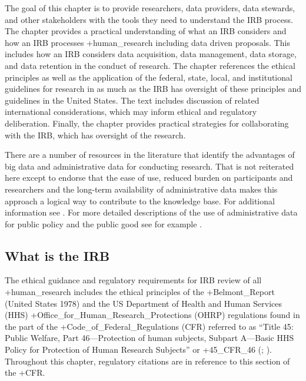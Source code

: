 \documentclass[
]{WileySix}
\begin{document}
The goal of this chapter is to provide researchers, data providers, data stewards, and other stakeholders with the tools they need to understand the IRB process. The chapter provides a practical understanding of what an IRB considers and how an IRB processes +human\_research\textbar{} including data driven proposals. This includes how an IRB considers data acquisition, data management, data storage, and data retention in the conduct of research. The chapter references the ethical principles as well as the application of the federal, state, local, and institutional guidelines for research in as much as the IRB has oversight of these principles and guidelines in the United States. The text includes discussion of related international considerations, which may inform ethical and regulatory deliberation. Finally, the chapter provides practical strategies for collaborating with the IRB, which has oversight of the research.

There are a number of resources in the literature that identify the advantages of big data and administrative data for conducting research. That is not reiterated here except to endorse that the ease of use, reduced burden on participants and researchers and the long-term availability of administrative data makes this approach a logical way to contribute to the knowledge base. For additional information see \citep{feeney2015, connelly2016, collmann2016}. For more detailed descriptions of the use of administrative data for public policy and the public good see for example \citep{card2010, collmann2016, figlio2016}.

\hypertarget{what-is-the-irb}{%
\subsection{What is the IRB}\label{what-is-the-irb}}

The ethical guidance and regulatory requirements for IRB review of all +human\_research\textbar{} includes the ethical principles of the +Belmont\_Report\textbar{} (United States 1978) and the US Department of Health and Human Services (HHS) +Office\_for\_Human\_Research\_Protections\textbar{} (OHRP) regulations found in the part of the +Code\_of\_Federal\_Regulations\textbar{} (CFR) referred to as ``Title 45: Public Welfare, Part 46---Protection of human subjects, Subpart A---Basic HHS Policy for Protection of Human Research Subjects'' or +45\_CFR\_46\textbar{} (\citet{codeoffederalregulations2017c}; \citet{officeforhumanresearchprotections2016}). Throughout this chapter, regulatory citations are in reference to this section of the +CFR\textbar.
\end{document}
